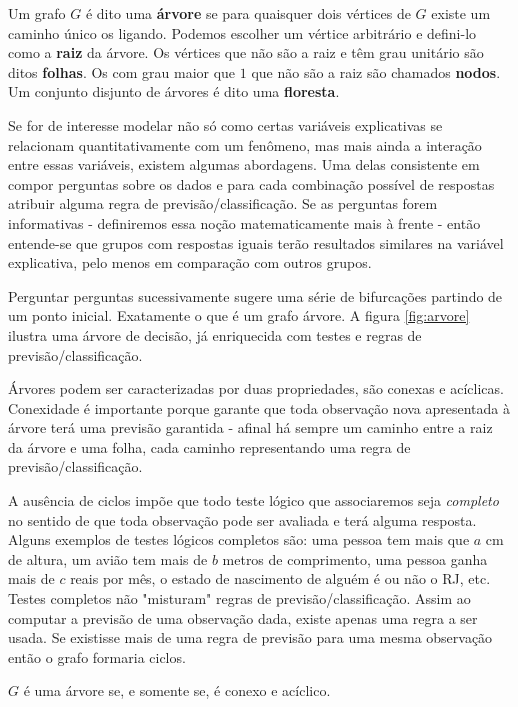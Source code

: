 \begin{defi}[Árvores]
Um grafo $G$ é dito uma \textbf{árvore} se para quaisquer dois vértices de $G$ existe um caminho único os ligando. Podemos escolher um vértice arbitrário e defini-lo como a \textbf{raiz} da árvore. Os vértices que não são a raiz e têm grau unitário são ditos \textbf{folhas}. Os com grau maior que $1$ que não são a raiz são chamados \textbf{nodos}. Um conjunto disjunto de árvores é dito uma \textbf{floresta}.
\end{defi}

Se for de interesse modelar não só como certas variáveis explicativas se relacionam quantitativamente com um fenômeno, mas mais ainda a interação entre essas variáveis, existem algumas abordagens. Uma delas consistente em compor perguntas sobre os dados e para cada combinação possível de respostas atribuir alguma regra de previsão/classificação. Se as perguntas forem informativas - definiremos essa noção matematicamente mais à frente - então entende-se que grupos com respostas iguais terão resultados similares na variável explicativa, pelo menos em comparação com outros grupos. 

Perguntar perguntas sucessivamente sugere uma série de bifurcações partindo de um ponto inicial. Exatamente o que é um grafo árvore. A figura \ref{fig:arvore} ilustra uma árvore de decisão, já enriquecida com testes e regras de previsão/classificação. 

Árvores podem ser caracterizadas por duas propriedades, são conexas e acíclicas. Conexidade é importante porque garante que toda observação nova apresentada à árvore terá uma previsão garantida - afinal há sempre um caminho entre a raiz da árvore e uma folha, cada caminho representando uma regra de previsão/classificação.

A ausência de ciclos impõe que todo teste lógico que associaremos seja \textit{completo} no sentido de que toda observação pode ser avaliada e terá alguma resposta. Alguns exemplos de testes lógicos completos são: uma pessoa tem mais que $a$ cm de altura, um avião tem mais de $b$ metros de comprimento, uma pessoa ganha mais de $c$ reais por mês, o estado de nascimento de alguém é ou não o RJ, etc. Testes completos não "misturam" regras de previsão/classificação. Assim ao computar a previsão de uma observação dada, existe apenas uma regra a ser usada. Se existisse mais de uma regra de previsão para uma mesma observação então o grafo formaria ciclos. 

\begin{teo}
$G$ é uma árvore se, e somente se, é conexo e acíclico.
\end{teo}

